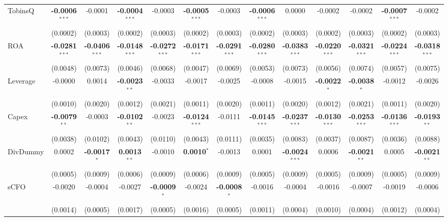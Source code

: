 \begin{landscape}
\begin{table}[H]
\begin{tabular}{lcccccccccccc}
TobinsQ & \textbf{-0.0006}$^{***}$ & -0.0001 & \textbf{-0.0004}$^{***}$ & -0.0003 & \textbf{-0.0005}$^{***}$ & -0.0003 & \textbf{-0.0006}$^{***}$ & 0.0000 & -0.0002 & -0.0002 & \textbf{-0.0007}$^{***}$ & -0.0002 \\
 & (0.0002) & (0.0003) & (0.0002) & (0.0003) & (0.0002) & (0.0003) & (0.0002) & (0.0003) & (0.0002) & (0.0003) & (0.0002) & (0.0003) \\
ROA & \textbf{-0.0281}$^{***}$ & \textbf{-0.0406}$^{***}$ & \textbf{-0.0148}$^{***}$ & \textbf{-0.0272}$^{***}$ & \textbf{-0.0171}$^{***}$ & \textbf{-0.0291}$^{***}$ & \textbf{-0.0280}$^{***}$ & \textbf{-0.0383}$^{***}$ & \textbf{-0.0220}$^{***}$ & \textbf{-0.0321}$^{***}$ & \textbf{-0.0224}$^{***}$ & \textbf{-0.0318}$^{***}$ \\
 & (0.0048) & (0.0073) & (0.0046) & (0.0068) & (0.0047) & (0.0069) & (0.0053) & (0.0073) & (0.0056) & (0.0074) & (0.0057) & (0.0075) \\
Leverage & -0.0000 & 0.0014 & \textbf{-0.0023}$^{**}$ & -0.0033 & -0.0017 & -0.0025 & -0.0008 & -0.0015 & \textbf{-0.0022}$^{*}$ & \textbf{-0.0038}$^{*}$ & -0.0012 & -0.0026 \\
 & (0.0010) & (0.0020) & (0.0012) & (0.0021) & (0.0011) & (0.0020) & (0.0011) & (0.0020) & (0.0012) & (0.0021) & (0.0011) & (0.0020) \\
Capex & \textbf{-0.0079}$^{**}$ & -0.0003 & \textbf{-0.0102}$^{**}$ & -0.0023 & \textbf{-0.0124}$^{***}$ & -0.0111 & \textbf{-0.0145}$^{***}$ & \textbf{-0.0237}$^{***}$ & \textbf{-0.0130}$^{***}$ & \textbf{-0.0253}$^{***}$ & \textbf{-0.0136}$^{***}$ & \textbf{-0.0193}$^{**}$ \\
 & (0.0038) & (0.0102) & (0.0043) & (0.0110) & (0.0043) & (0.0111) & (0.0035) & (0.0083) & (0.0037) & (0.0087) & (0.0036) & (0.0088) \\
DivDummy & 0.0002 & \textbf{-0.0017}$^{*}$ & \textbf{0.0013}$^{**}$ & -0.0010 & \textbf{0.0010}$^{*}$ & -0.0013 & 0.0001 & \textbf{-0.0024}$^{***}$ & 0.0006 & \textbf{-0.0021}$^{**}$ & 0.0005 & \textbf{-0.0021}$^{**}$ \\
 & (0.0005) & (0.0009) & (0.0006) & (0.0009) & (0.0006) & (0.0009) & (0.0005) & (0.0009) & (0.0005) & (0.0009) & (0.0005) & (0.0009) \\
sCFO & -0.0020 & -0.0004 & -0.0027 & \textbf{-0.0009}$^{*}$ & -0.0024 & \textbf{-0.0008}$^{*}$ & -0.0016 & -0.0004 & -0.0016 & -0.0007 & -0.0019 & -0.0006 \\
 & (0.0014) & (0.0005) & (0.0017) & (0.0005) & (0.0016) & (0.0005) & (0.0011) & (0.0004) & (0.0010) & (0.0004) & (0.0012) & (0.0004) \\

\end{tabular}
\end{table}
\end{landscape}
